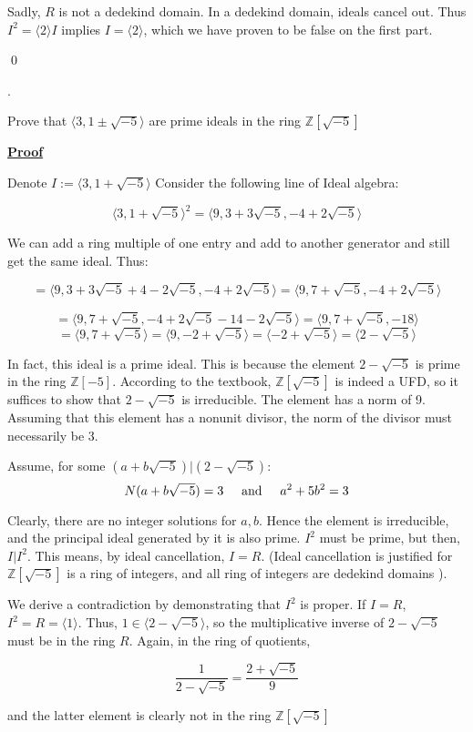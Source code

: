 \documentclass{article}
\def\ZZ{{\mathbb{Z}}}
\def\contradiction{{\lightning}}
\newcounter{problemcnt}
\newcommand{\Problem}{{
    \vspace{5mm}
    \stepcounter{problemcnt}
    \noindent
    \arabic{problemcnt}. 
}
}
\newcommand{\Proof}{{
    \vspace{2mm}
    \noindent
    \textbf{
    \underline{Proof}}
}
}
\newcommand{\textAnd}{
    \hspace{5mm}
    \textrm{and}
    \hspace{5mm}
}
\newcommand{\<}{{
    \langle
}}
\def\>{{
    \rangle
}}
\def\ZZ{{\mathbb{Z}}}
\begin{document}
Sadly, $R$ is not a dedekind domain. In a dedekind domain, 
ideals cancel out. Thus $I^2 = \<2\>I$ implies $I = \<2\>$, 
which we have proven to be false on the first part. 
\contradiction

\qed

\newpage

\Problem
Prove that $\<3, 1\pm \sqrt{-5}\>$ are prime ideals in the ring 
$\ZZ[\sqrt{-5}]$

\Proof
Denote $I:=\<3, 1+ \sqrt{-5}\>$
Consider the following line of Ideal algebra:

\[
    \<3, 1+\sqrt{-5}\>^2 = \<9, 3+3\sqrt{-5}, -4+2\sqrt{-5}\>
\]

We can add a ring multiple of one entry and add to another generator 
and still get the same ideal. Thus:

\[
    = \<9, 3+3\sqrt{-5} +4 - 2\sqrt{-5}, -4+2\sqrt{-5}\> 
    = \<9, 7+\sqrt{-5}, -4+2\sqrt{-5}\> 
\]

\[
    = \<9, 7+\sqrt{-5}, -4+2\sqrt{-5}-14-2\sqrt{-5}\>
    = \<9, 7+\sqrt{-5}, -18\> 
\]
\[
    = \<9, 7+\sqrt{-5}\> = \<9, -2+\sqrt{-5}\>
    = \<-2+\sqrt{-5}\> = \<2-\sqrt{-5}\>
\]

In fact, this ideal is a prime ideal. This is because the element 
$2-\sqrt{-5}$ is prime in the ring $\ZZ[-5]$. According to the textbook, 
$\ZZ[\sqrt{-5}]$ is indeed a UFD, so it suffices to show that 
$2-\sqrt{-5}$ is irreducible. The element has a norm of 9. 
Assuming that this element has a nonunit divisor, the norm of 
the divisor must necessarily be 3. 

Assume, for some $(a+b\sqrt{-5}) | (2-\sqrt{-5})$:
\[
    N(a+b\sqrt{-5}) = 3 \textAnd a^2+5b^2 = 3
\]

Clearly, there are no integer solutions for $a, b$. 
Hence the element is irreducible, and the principal ideal 
generated by it is also prime. $I^2$ must be prime, but then, 
$I|I^2$. This means, by ideal cancellation, $I = R$. 
(Ideal cancellation is justified for $\ZZ[\sqrt{-5}]$ is a ring 
of integers, and all ring of integers are dedekind domains
). 

We derive a contradiction by demonstrating that 
$I^2$ is proper. If $I = R$, $I^2 = R = \<1\>$. Thus, 
$1 \in \<2-\sqrt{-5}\>$, so the multiplicative 
inverse of $2-\sqrt{-5}$ must be in the ring $R$. 
Again, in the ring of quotients, 

\[
    \frac{1}{2-\sqrt{-5}} = \frac{2+\sqrt{-5}}{9}
\]

and the latter element is clearly not in the ring 
$\ZZ[\sqrt{-5}]$ \contradiction 
\end{document}
